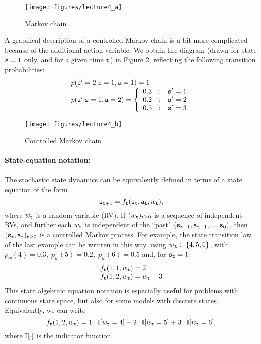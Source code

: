 \begin{figure}
  \begin{centering}
  \texttt{[image: figures/lecture4\_a]}\\
  \caption{Markov chain}\label{fig:MC}
  \end{centering}
\end{figure}

A graphical description of a controlled Markov chain is a bit more
complicated because of the additional action variable. We obtain the
diagram (drawn for state ${\tt s} = 1$ only, and for a given time
${\tt t}$) in Figure \ref{fig:MDP}, reflecting the following
transition probabilities:
\[\begin{array}{l}
p(\state' = 2|\state = 1,\action = 1) = 1\\
p(\state'|\state = 1,\action = 2) = \left\{ {\begin{array}{*{20}{c}}
{0.3}&:&{\state' = 1}\\
{0.2}&:&{\state' = 2}\\
{0.5}&:&{\state' = 3}
\end{array}} \right.
\end{array}\]

\begin{figure}
  \begin{centering}
  \texttt{[image: figures/lecture4\_b]}\\
  \caption{Controlled Markov chain}\label{fig:MDP}
  \end{centering}
\end{figure}


\paragraph{State-equation notation:}
The stochastic state dynamics can be equivalently defined in terms of a state equation of the form
                                                   \[{{\tt s}_{{\tt t} + 1}} = {f_{\tt t}}({{\tt s}_{\tt t}},{{\tt a}_{\tt t}},{w_{\tt t}}),\]
where ${w_{\tt t}}$ is a random variable (RV).
    If  ${({w_{\tt t}})_{{\tt t} \ge 0}}$ is a sequence of independent RVs, and further each ${w_{\tt t}}$ is independent of the ``past"  $({{\tt s}_{{\tt t} - 1}},{{\tt a}_{{\tt t} - 1}}, \ldots {{\tt s}_0})$, then ${({{\tt s}_{\tt t}},{{\tt a}_{\tt t}})_{{\tt t} \ge 0}}$ is a controlled Markov process.
    For example, the state transition law of the last example can be written in this way, using
                  ${w_{\tt t}} \in \{ 4,5,6\} $,  with  ${p_w}(4) = 0.3,\;{p_w}(5) = 0.2,\;{p_w}(6) = 0.5$
and, for ${{\tt s}_{\tt t}} = 1$:
    \[\begin{array}{l}
    {f_{\tt t}}(1,1,{w_{\tt t}}) = 2\\
    {f_{\tt t}}(1,2,{w_{\tt t}}) = {w_{\tt t}} - 3
    \end{array}\]
  This state algebraic equation notation is especially useful for problems with continuous state space, but also for some models with discrete states.
Equivalently, we can write
    \[
 {f_{\tt t}}(1,2,{w_{\tt t}}) = 1\cdot \mathbb{I}[{w_{\tt t}}=4]+2\cdot \mathbb{I}[{w_{\tt t}}=5]+3\cdot \mathbb{I}[{w_{\tt t}}=6] ,
    \]
where $\mathbb{I}[\cdot]$ is the indicator function.


